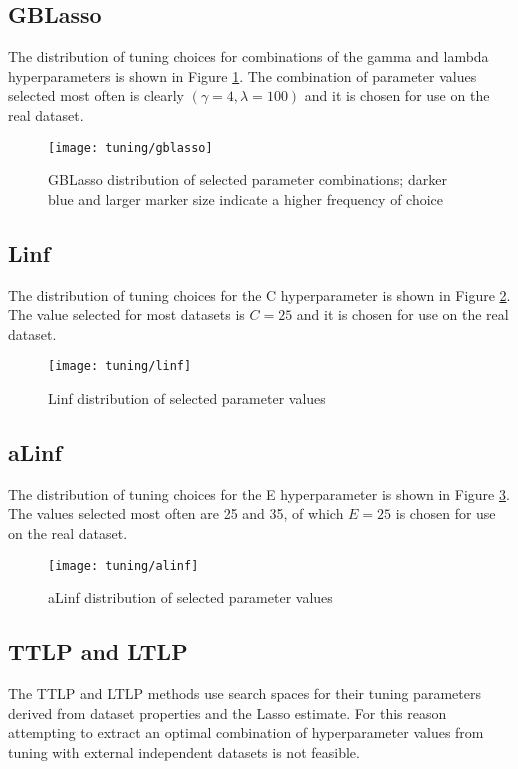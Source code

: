\subsection{GBLasso}
The distribution of tuning choices for combinations of the gamma and lambda hyperparameters is shown in Figure \ref{fig:tun_gblasso}. The combination of parameter values selected most often is clearly $(\gamma = 4, \lambda=100)$ and it is chosen for use on the real dataset.
\begin{figure}[H]
	\centering
	\texttt{[image: tuning/gblasso]}
	\caption{GBLasso distribution of selected parameter combinations; darker blue and larger marker size indicate a higher frequency of choice}
	\label{fig:tun_gblasso}
\end{figure}
\pagebreak

\subsection{Linf}
The distribution of tuning choices for the C hyperparameter is shown in Figure \ref{fig:tun_linf}. The value selected for most datasets is $C = 25$ and it is chosen for use on the real dataset.
\begin{figure}[H]
	\centering
	\texttt{[image: tuning/linf]}
	\caption{Linf distribution of selected parameter values}
	\label{fig:tun_linf}
\end{figure}
\pagebreak

\subsection{aLinf}
The distribution of tuning choices for the E hyperparameter is shown in Figure \ref{fig:tun_alinf}. The values selected most often are 25 and 35, of which $E = 25$ is chosen for use on the real dataset.
\begin{figure}[H]
	\centering
	\texttt{[image: tuning/alinf]}
	\caption{aLinf distribution of selected parameter values}
	\label{fig:tun_alinf}
\end{figure}
\pagebreak

\subsection{TTLP and LTLP}
The TTLP and LTLP methods use search spaces for their tuning parameters derived from dataset properties and the Lasso estimate. For this reason attempting to extract an optimal combination of hyperparameter values from tuning with external independent datasets is not feasible. 

